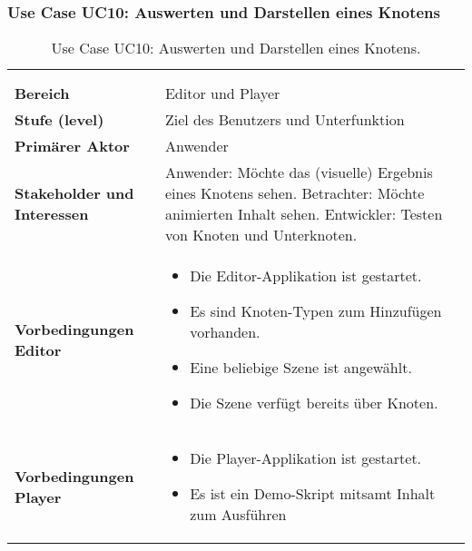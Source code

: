 
\subsubsection{Use Case UC10: Auswerten und Darstellen eines Knotens}
\label{ssubsec:requirements:use-cases:uc10}

\begin{longtabu}{p{0.5\textwidth}p{0.5\textwidth}}
    \centering\\
    \caption{Use Case UC10: Auswerten und Darstellen eines
        Knotens.}\label{table:uc10-render-node}\\
    \toprule
        \textbf{Bereich} &
        Editor und Player \\
    \cmidrule(r){1-1}\cmidrule(lr){2-2}
        \textbf{Stufe (level)} &
        Ziel des Benutzers und Unterfunktion\\
    \cmidrule(r){1-1}\cmidrule(lr){2-2}
        \textbf{Primärer Aktor} &
        Anwender \\
    \cmidrule(r){1-1}\cmidrule(lr){2-2}
        \textbf{Stakeholder und Interessen} &
        Anwender: Möchte das (visuelle) Ergebnis eines Knotens
        sehen.\newline
        Betrachter: Möchte animierten Inhalt sehen.\newline
        Entwickler: Testen von Knoten und Unterknoten. \\
    \cmidrule(r){1-1}\cmidrule(lr){2-2}
        \textbf{Vorbedingungen Editor} &
        \begin{itemize}
            \item{Die Editor-Applikation ist gestartet.}
            \item{Es sind Knoten-Typen zum Hinzufügen vorhanden.}
            \item{Eine beliebige Szene ist angewählt.}
            \item{Die Szene verfügt bereits über Knoten.}
        \end{itemize} \\
    \cmidrule(r){1-1}\cmidrule(lr){2-2}
        \textbf{Vorbedingungen Player} &
        \begin{itemize}
            \item{Die Player-Applikation ist gestartet.}
            \item{Es ist ein Demo-Skript mitsamt Inhalt zum Ausführen
}
\end{itemize}
\end{longtabu}
